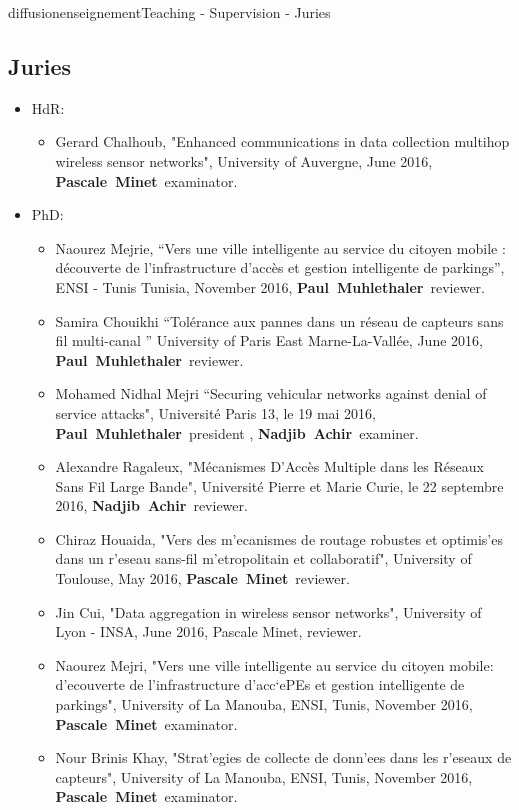 \documentclass{ra2016}
\newcommand{\paul}  {\textbf{Paul~Muhlethaler}}
\newcommand{\pascale} {\textbf{Pascale~Minet}}
\newcommand{\achir}  {\textbf{Nadjib~Achir}}
\begin{document}
\begin{module}{diffusion}{enseignement}{Teaching - Supervision - Juries}
\subsection {Juries}
\begin{itemize}
    \item HdR: 
        \begin{itemize}
                	\item Gerard Chalhoub,  "Enhanced communications in data collection multihop wireless sensor networks", University of Auvergne, June 2016, \pascale~examinator.
        \end{itemize} 
    \item PhD: 
        \begin{itemize}
           \item Naourez Mejrie, ``Vers une ville intelligente au service du citoyen mobile : découverte de l’infrastructure d’accès et gestion intelligente de parkings'', ENSI - Tunis Tunisia, November 2016, \paul~reviewer.
             \item   Samira Chouikhi  ``Tolérance aux pannes dans un réseau de capteurs sans fil multi-canal '' University of Paris East Marne-La-Vall\'ee,  June 2016, \paul~reviewer.
             \item Mohamed Nidhal Mejri ``Securing vehicular networks against denial of service attacks", Université Paris 13, le 19 mai 2016,  \paul~president ,  \achir~examiner.
             \item   Alexandre Ragaleux, "Mécanismes D’Accès Multiple dans les Réseaux Sans Fil Large Bande", Université Pierre et Marie Curie, le 22 septembre 2016,  \achir~reviewer.  
              \item Chiraz Houaida, "Vers des m'ecanismes de routage robustes et optimis'es dans un r'eseau sans-fil m'etropolitain et collaboratif", University of Toulouse, May 2016, \pascale~reviewer.
             \item Jin Cui, "Data aggregation in wireless sensor networks", University of Lyon - INSA, June 2016, Pascale Minet, reviewer.
		\item Naourez Mejri, "Vers une ville intelligente au service du citoyen mobile: d'ecouverte de l'infrastructure d'acc`ePEs et gestion intelligente de parkings", University of La Manouba, ENSI, Tunis, November 2016, \pascale~examinator.
          	\item Nour Brinis Khay, "Strat'egies de collecte de donn'ees dans les r'eseaux de capteurs", University of La Manouba, ENSI, Tunis, November 2016, \pascale~examinator.

\end{itemize}
\end{itemize}
\end{module}
\end{document}
